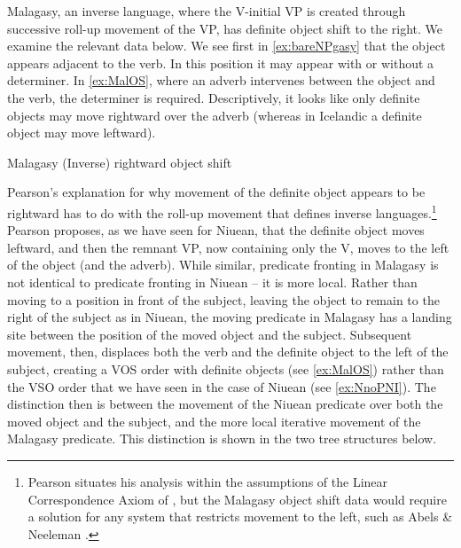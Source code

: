 \documentclass[output=paper,colorlinks,citecolor=brown,
]{langscibook}
\begin{document}
Malagasy, an inverse language, where the V-initial VP is created through successive roll-up movement of the VP, has definite object shift to the right.   We examine the relevant data below.  We see first in \ref{ex:bareNPgasy} that the object appears adjacent to the verb. In this position it may  appear with or without a determiner.  In \ref{ex:MalOS}, where an adverb intervenes between the object and the verb, the determiner is required.  Descriptively, it looks like only definite objects may move rightward over the adverb (whereas in Icelandic a definite object may move leftward). 

\ea Malagasy (Inverse) rightward object shift
	\z
\z

 Pearson's explanation for why movement of the definite object appears to be rightward has to do with the roll-up movement that defines inverse languages.\footnote{Pearson situates his analysis within the assumptions of the Linear Correspondence Axiom of \cite{Kayne:1994}, but the Malagasy object shift data would require a solution for any system that restricts movement to the left, such as Abels \& Neeleman \citeyearpar{Abels:2012}.}  Pearson proposes, as we have seen for Niuean, that the definite object moves leftward, and then the remnant VP, now containing only the V, moves to the left of the object (and the adverb).  While similar, predicate fronting in Malagasy is not identical to  predicate fronting in Niuean -- it is more local.  Rather than moving to a position in front of the subject, leaving the object to remain to the right of the subject as in Niuean, the moving predicate in Malagasy has a landing site between the position of the moved object and the subject.  Subsequent movement, then, displaces both the verb and the definite object to the left of the subject, creating a VOS order with definite objects  (see \ref{ex:MalOS}) rather than the VSO order that we have seen in the case of Niuean (see \ref{ex:NnoPNI}).  The distinction then is between the movement of the Niuean predicate over both the moved object and the subject, and the more local iterative movement of the Malagasy predicate.  This distinction is shown in the two tree structures below.
\end{document}
